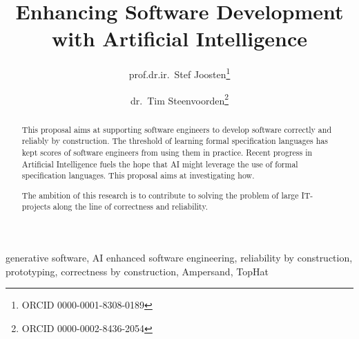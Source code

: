 \documentclass{elsarticle}
\begin{document}
% 

\title{Enhancing Software Development with Artificial Intelligence}
\author{prof.dr.ir.\ Stef Joosten\footnote{ORCID 0000-0001-8308-0189}}
\author{dr.\ Tim Steenvoorden\footnote{ORCID 0000-0002-8436-2054}}
\address{Open Universiteit Nederland, Heerlen, the Netherlands}

\begin{abstract}
    This proposal aims at supporting software engineers to develop software correctly and reliably by construction.
    The threshold of learning formal specification languages has kept scores of software engineers from using them in practice.
    Recent progress in Artificial Intelligence fuels the hope that AI might leverage the use of formal specification languages.
    This proposal aims at investigating how.

    The ambition of this research is to contribute to solving the problem of large IT-projects
    along the line of correctness and reliability.
\end{abstract}

\begin{keyword}
    generative software, AI enhanced software engineering, reliability by construction, prototyping, correctness by construction, Ampersand, TopHat
\end{keyword}
\maketitle
\end{document}
